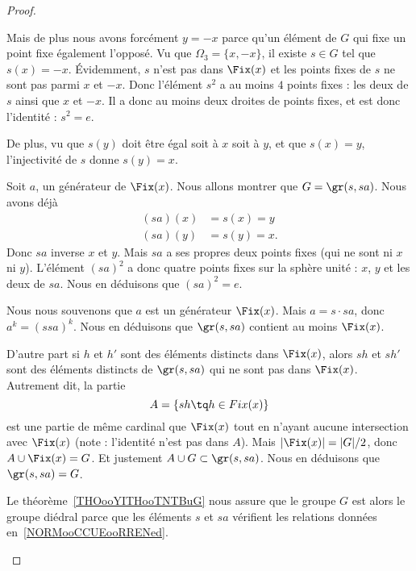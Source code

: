 \begin{proof}
\begin{subproof}
		Mais de plus nous avons forcément \( y=-x\) parce qu'un élément de \( G\) qui fixe un point fixe également l'opposé. Vu que \( \Omega_3=\{ x,-x \}\), il existe \( s\in G\) tel que \( s(x)=-x\). Évidemment, \( s\) n'est pas dans \( \Fix(x)\) et les points fixes de \( s\) ne sont pas parmi \( x\) et \( -x\). Donc l'élément \( s^2\) a au moins \( 4\) points fixes : les deux de \( s\) ainsi que \( x\) et \( -x\). Il a donc au moins deux droites de points fixes, et est donc l'identité : \( s^2=e\).

		De plus, vu que \( s(y)\) doit être égal soit à \( x\) soit à \( y\), et que \( s(x)=y\), l'injectivité de \( s\) donne \( s(y)=x\).

		Soit \( a\), un générateur de \( \Fix(x)\). Nous allons montrer que \( G=\gr(s,sa)\). Nous avons déjà
		\begin{subequations}
			\begin{align}
				(sa)(x) & =s(x)=y \\
				(sa)(y) & =s(y)=x.
			\end{align}
		\end{subequations}
		Donc \( sa\) inverse \( x\) et \( y\). Mais \( sa\) a ses propres deux points fixes (qui ne sont ni \( x\) ni \( y\)). L'élément \( (sa)^2\) a donc quatre points fixes sur la sphère unité : \( x\), \( y\) et les deux de \( sa\). Nous en déduisons que \( (sa)^2=e\).

		Nous nous souvenons que \( a\) est un générateur \( \Fix(x)\). Mais \( a=s\cdot sa\), donc \( a^k=(ssa)^k\). Nous en déduisons que \( \gr(s,sa)\) contient au moins \( \Fix(x)\).

		D'autre part si \( h\) et \( h'\) sont des éléments distincts dans \( \Fix(x)\), alors \( sh\) et \( sh'\) sont des éléments distincts de \( \gr(s,sa)\) qui ne sont pas dans \( \Fix(x)\). Autrement dit, la partie
		\begin{equation}
			A=\{ sh\tq h\in Fix(x) \}
		\end{equation}
		est une partie de même cardinal que \( \Fix(x)\) tout en n'ayant aucune intersection avec \( \Fix(x)\) (note : l'identité n'est pas dans \( A\)). Mais \( | \Fix(x) |=| G |/2\), donc \( A\cup\Fix(x)=G\). Et justement \( A\cup G\subset \gr(s,sa)\). Nous en déduisons que \( \gr(s,sa)=G\).

		Le théorème~\ref{THOooYITHooTNTBuG} nous assure que le groupe \( G\) est alors le groupe diédral parce que les éléments \( s\) et \( sa\) vérifient les relations données en~\ref{NORMooCCUEooRRENed}.


\end{subproof}
\end{proof}
